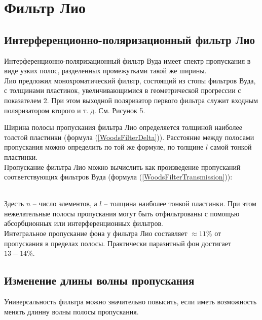 

\section{Фильтр Лио}

\subsection{Интерференционно-поляризационный фильтр Лио}

Интерференционно-поляризационный фильтр Вуда имеет спектр пропускания в виде узких полос,
разделенных промежутками такой же ширины. \\

Лио предложил монохроматический фильтр, состоящий из стопы фильтров Вуда, с толщинами
пластинок, увеличивающимися в геометрической прогрессии с показателем 2. При этом
выходной поляризатор первого фильтра служит входным поляризатором второго и т. д. См.
Рисунок 5.


Ширина полосы пропускания фильтра Лио определяется толщиной наиболее толстой пластинки
(формула (\ref{WoodsFilterDelta})). Расстояние между полосами пропускания можно определить
по той же формуле, по толщине $ l $ самой тонкой пластинки. \\

Пропускание фильтра Лио можно вычислить как произведение пропусканий соответствующих
фильтров Вуда (формула (\ref{WoodsFilterTransmission})):

 \\

Здесть $ n $ -- число элементов, а $ l $ -- толщина наиболее тонкой пластинки. При этом
нежелательные полосы пропускания могут быть отфильтрованы с помощью абсорбционных или
интерференционных фильтров. \\

Интегральное пропускание фона у фильтра Лио составляет $ \approx 11\% $ от пропускания
в пределах полосы. Практически паразитный фон достигает $ 13 - 14\% $.

\subsection{Изменение длины волны пропускания}

Универсальность фильтра можно значительно повысить, если иметь возможность менять
длинну волны полосы пропускания. \\

